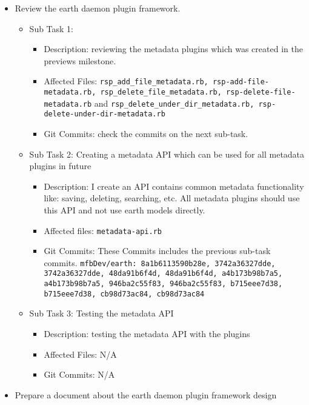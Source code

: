 \begin{itemize}
    \item Review the earth daemon plugin framework.
        \begin{itemize}
            \item Sub Task 1:
                \begin{itemize}
                    \item Description: reviewing the metadata plugins which was created in the previews milestone.
                    \item Affected Files: \texttt{rsp\_add\_file\_metadata.rb, rsp-add-file-metadata.rb, rsp\_delete\_file\_metadata.rb, rsp-delete-file-metadata.rb} and \texttt{rsp\_delete\_under\_dir\_metadata.rb, rsp-delete-under-dir-metadata.rb}
                    \item Git Commits: check the commits on the next sub-task.
                \end{itemize}
            \item Sub Task 2: Creating a metadata API which can be used for all metadata plugins in future
                \begin{itemize}
                    \item Description: I create an API contains common metadata functionality like: saving, deleting, searching, etc. All metadata plugins should use this API and not use earth models directly. 
                    \item Affected files: \texttt{metadata-api.rb}
                    \item Git Commits: These Commits includes the previous sub-task commits. 
\texttt{mfbDev/earth: 8a1b6113590b28e, 3742a36327dde, 3742a36327dde, 48da91b6f4d, 48da91b6f4d, a4b173b98b7a5, a4b173b98b7a5, 946ba2c55f83, 946ba2c55f83, b715eee7d38, b715eee7d38, cb98d73ac84, cb98d73ac84}
                \end{itemize}
            \item Sub Task 3: Testing the metadata API
                \begin{itemize}
                    \item Description: testing the metadata API with the plugins  
                    \item Affected Files: N/A
                    \item Git Commits: N/A
                \end{itemize}
        \end{itemize} 
\newpage     
    \item Prepare a document about the earth daemon plugin framework design

\end{itemize}
